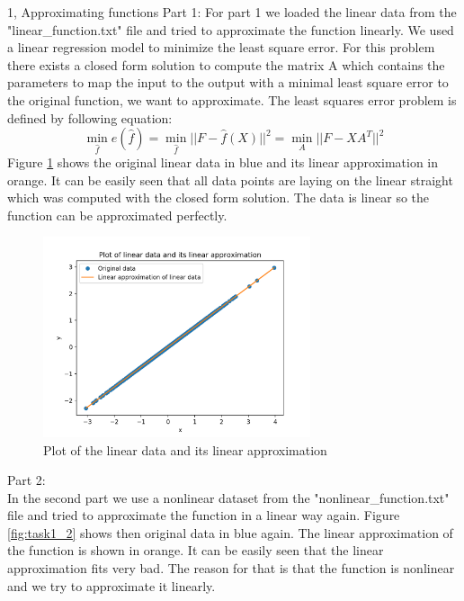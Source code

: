 \documentclass[10pt,a4paper]{article}
\begin{document}
\frontpage

\begin{task}{1, Approximating functions}
Part 1: \bigbreak
For part 1 we loaded the linear data from the "linear\_function.txt" file and tried to approximate the function linearly. We used a linear regression model to minimize the least square error. For this problem there exists a closed form solution to compute the matrix A which contains the parameters to map the input to the output with a minimal least square error to the original function, we want to approximate. 
The least squares error problem is defined by following equation:
\begin{equation*}
\min_{\hat{f}}e(\hat{f}) = \min_{\hat{f}}||F-\hat{f}(X)||^2 = \min_{A}||F-XA^T||^2
\end{equation*}
Figure \ref{fig:task1_1} shows the original linear data in blue and its linear approximation in orange. It can be easily seen that all data points are laying on the linear straight which was computed with the closed form solution. The data is linear so the function can be approximated perfectly.
\begin{figure}[H]
\centering
\includegraphics[width=0.7\textwidth]{../plots/task1_part1.png}
\caption{Plot of the linear data and its linear approximation}
\label{fig:task1_1}
\end{figure}
Part 2: \\
In the second part we use a nonlinear dataset from the "nonlinear\_function.txt" file and tried to approximate the function in a linear way again.
Figure \ref{fig:task1_2} shows then original data in blue again. The linear approximation of the function is  shown in orange. It can be easily seen that the linear approximation fits very bad. The reason for that is that the function is nonlinear and we try to approximate it linearly.
\begin{figure}[H]

\end{figure}
\end{task}
\end{document}

